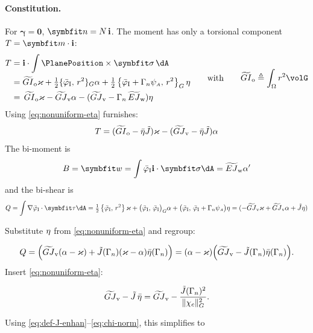 \paragraph{Constitution.}
For \(\bm{\gamma} = \bm{0}\), \(\bm{n} = N \, \FrameBasis\). 
The moment has only a torsional component \(T=\bm{m}\cdot\FrameBasis\):
$$
\begin{aligned}
T 
&= \FrameBasis \cdot \int \PlanePosition \times \StressVector\, \dA \\
&= \GIo \Twist + \tfrac{1}{2}\{\WarpTwistIesan,\, r^2 \}_G \alpha 
 + \tfrac{1}{2} \left\{\WarpTwistIesan + \EnhanConstFA \WarpFA,\, r^2 \right\}_G \EnhanParam \\
&= \, \GIo\Twist - \GJv \alpha - (\GJv - \EnhanConstFA \, \EJw) \EnhanParam
\end{aligned}
\qquad\text{with}\qquad 
\begin{aligned}
\GIo &\triangleq \int_{\Section} r^2 \volG \\
\end{aligned}
$$
Using \eqref{eq:nonuniform-eta} furnishes:
\[
T = (\widetilde{GI}_{\mathrm{o}} - \bar{\eta}\tilde{J})\varkappa - (\widetilde{GJ}_{\mathrm{v}} - \bar{\eta}\tilde{J})\alpha
\]
The bi-moment is
\begin{equation}
B = \bm{w} = \int \WarpTwistIesan \FrameBasis \cdot \StressVector \dA =  \EJw \alpha'
\label{eq:nonuniform-bimoment}
\end{equation}
and the bi-shear is
\begin{equation*}
Q = \int \nabla \WarpTwistIesan \cdot \bm{\tau} \dA
= \tfrac{1}{2}\left\{\WarpTwistIesan,\, r^2\right\} \Twist 
+ \bigl(\WarpTwistIesan,\, \WarpTwistIesan \bigr)_G \alpha 
+ \bigl(\WarpTwistIesan,\, \WarpTwistIesan + \EnhanConstFA \WarpFA\bigr) \EnhanParam
= (-\GJv \Twist + \GJv \alpha + \tilde{J} \EnhanParam )
\end{equation*}


Substitute \({\eta}\) from \eqref{eq:nonuniform-eta} and regroup:

\begin{equation}
Q
= \Big(\widetilde{GJ}_{\mathrm{v}}(\alpha-\varkappa)+\tilde{J}(\Gamma_{n})(\varkappa-\alpha)\bar\eta(\Gamma_{n})\Big)
= (\alpha-\varkappa)\Big(\widetilde{GJ}_{\mathrm{v}}-\tilde{J}(\Gamma_{n})\bar\eta(\Gamma_{n})\Big).
\label{eq:nonuniform-bishear}
\end{equation}
\iffalse
Insert \eqref{eq:nonuniform-eta}:

\[
\widetilde{GJ}_{\mathrm{v}}-\tilde J\,\bar\eta
=\widetilde{GJ}_{\mathrm{v}}-\frac{\tilde{J}(\Gamma_{n})^2}{\|\chi_c\|_G^2}.
\]

Using \eqref{eq:def-J-enhan}--\eqref{eq:chi-norm}, this simplifies to


